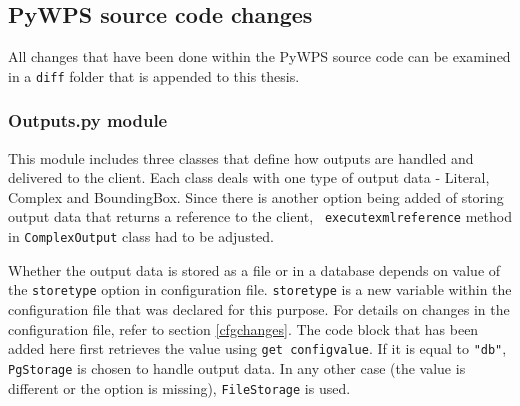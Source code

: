 \subsection{PyWPS source code changes} 

All changes that have been done within the PyWPS source code can be
examined in a \texttt{diff} folder that is appended to this thesis.


\subsubsection{Outputs.py module}

This module includes three classes that define how outputs are handled and delivered to the client. Each class deals with one type of output data - Literal, Complex and BoundingBox.
Since there is another option being added of storing output data that
returns a reference to the client, \texttt{\textunderscore
  execute\textunderscore xml\textunderscore reference} method in \texttt{ComplexOutput} class had to
be adjusted.

Whether the output data is stored as a file or in a database depends
on value of the \texttt{store\textunderscore type} option in
configuration file. \texttt{store\textunderscore type} is a new
variable within the configuration file that was declared for
this purpose. For details on changes in the configuration file,
refer to section \ref{cfgchanges}. The code block that has been added here
first retrieves the value using \texttt{get\textunderscore
  config\textunderscore value}. If it is equal to \texttt{"db"},
\texttt{PgStorage} is chosen to handle output data. In any other case
(the value is different or the option is missing),
\texttt{FileStorage} is used.

